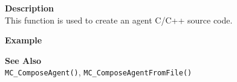 \noindent
{\bf Description}\\
This function is used to create an agent C/C++ source code. 

\noindent
{\bf Example}\\
\noindent
{\footnotesize}

\noindent
{\bf See Also}\\
\texttt{MC\_ComposeAgent()}, \texttt{MC\_ComposeAgentFromFile()}

